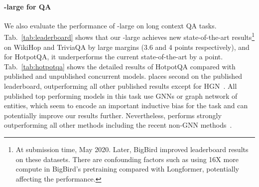 


\paragraph{\model-large for QA}
We also evaluate the performance of \model-large on long context QA tasks. Tab.~\ref{tab:leaderboard}
shows that our \model-large achieves new state-of-the-art
results\footnote{At submission time, May 2020. Later, BigBird \cite{Zaheer2020BigBT} improved leaderboard results on these datasets. There are confounding factors such as using 16X more compute in BigBird's pretraining compared with Longformer, potentially affecting the performance.} on WikiHop and TriviaQA by large margins (3.6 and 4 points respectively), and for HotpotQA, it underperforms the current state-of-the-art \cite{hotpotqasota} by a point.
Tab.~\ref{tab:hotpotqa} shows the detailed results of HotpotQA compared with published and unpublished concurrent models. \model places second on the published leaderboard, outperforming all other published results except for HGN~\cite{hotpotqasota}. All published top performing models in this task \cite{Tu2019SelectAA,hotpotqasota,Shao2020IsGS} use GNNs \cite{kipf2017semi} or graph network of entities, which seem to encode an important inductive bias for the task and can potentially improve our results further. 
Nevertheless, \model performs strongly outperforming all other methods including the recent non-GNN methods~\cite{Gla2019SpanSP,Shao2020IsGS,quark2020}.



